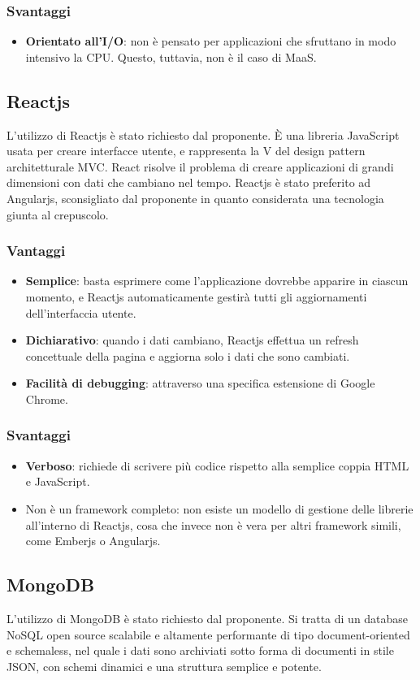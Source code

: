 \subsubsection{Svantaggi}
\begin{itemize}
\item \textbf{Orientato all'I/O}: non \`e pensato per applicazioni che sfruttano in modo intensivo la CPU. Questo, tuttavia, non \`e il caso di MaaS.
\end{itemize}
\subsection{Reactjs}
L'utilizzo di Reactjs \`e stato richiesto dal proponente. \`E una libreria JavaScript usata per creare interfacce utente, e rappresenta la V del design pattern architetturale MVC. React risolve il problema di creare applicazioni di grandi dimensioni con dati che cambiano nel tempo.
Reactjs \`e stato preferito ad Angularjs, sconsigliato dal proponente in quanto considerata una tecnologia giunta al crepuscolo.
\subsubsection{Vantaggi}
\begin{itemize}
\item \textbf{Semplice}: basta esprimere come l'applicazione dovrebbe apparire in ciascun momento, e Reactjs automaticamente gestir\`a tutti gli aggiornamenti dell'interfaccia utente.
\item \textbf{Dichiarativo}: quando i dati cambiano, Reactjs effettua un refresh concettuale della pagina e aggiorna solo i dati che sono cambiati.
\item \textbf{Facilit\`a di debugging}: attraverso una specifica estensione di Google Chrome.
\end{itemize}
\subsubsection{Svantaggi}
\begin{itemize}
\item \textbf{Verboso}: richiede di scrivere pi\`u codice rispetto alla semplice coppia HTML e JavaScript.
\item{Non \`e un framework completo}: non esiste un modello di gestione delle librerie all'interno di Reactjs, cosa che invece non \`e vera per altri framework simili, come Emberjs o Angularjs.
\end{itemize}
\subsection{MongoDB}
L'utilizzo di MongoDB \`e stato richiesto dal proponente. Si tratta di un database NoSQL open source scalabile e altamente performante di tipo document-oriented e schemaless, nel quale i dati sono archiviati sotto forma di documenti in stile JSON, con schemi dinamici e una struttura semplice e potente.
